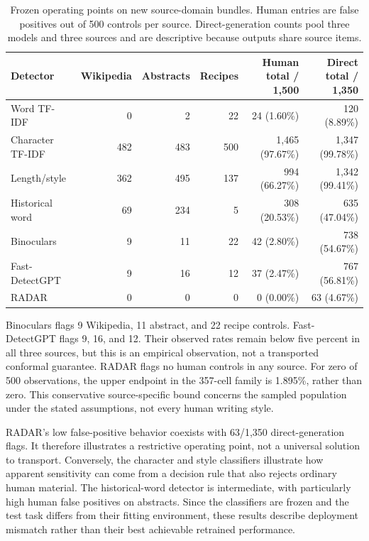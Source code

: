 \begin{table}[t]
\centering
\caption{Frozen operating points on new source-domain bundles. Human entries are false positives out of 500 controls per source. Direct-generation counts pool three models and three sources and are descriptive because outputs share source items.}
\label{tab:detectors}
\begin{tabular}{lrrrrr}
\toprule
Detector & Wikipedia & Abstracts & Recipes & Human total / 1,500 & Direct total / 1,350\\
\midrule
Word TF-IDF & 0 & 2 & 22 & 24 (1.60\%) & 120 (8.89\%)\\
Character TF-IDF & 482 & 483 & 500 & 1,465 (97.67\%) & 1,347 (99.78\%)\\
Length/style & 362 & 495 & 137 & 994 (66.27\%) & 1,342 (99.41\%)\\
Historical word & 69 & 234 & 5 & 308 (20.53\%) & 635 (47.04\%)\\
Binoculars & 9 & 11 & 22 & 42 (2.80\%) & 738 (54.67\%)\\
Fast-DetectGPT & 9 & 16 & 12 & 37 (2.47\%) & 767 (56.81\%)\\
RADAR & 0 & 0 & 0 & 0 (0.00\%) & 63 (4.67\%)\\
\bottomrule
\end{tabular}
\end{table}

Binoculars flags 9 Wikipedia, 11 abstract, and 22 recipe controls. Fast-DetectGPT flags 9, 16, and 12. Their observed rates remain below five percent in all three sources, but this is an empirical observation, not a transported conformal guarantee. RADAR flags no human controls in any source. For zero of 500 observations, the upper endpoint in the 357-cell family is 1.895\%, rather than zero. This conservative source-specific bound concerns the sampled population under the stated assumptions, not every human writing style.

RADAR's low false-positive behavior coexists with 63/1,350 direct-generation flags. It therefore illustrates a restrictive operating point, not a universal solution to transport. Conversely, the character and style classifiers illustrate how apparent sensitivity can come from a decision rule that also rejects ordinary human material. The historical-word detector is intermediate, with particularly high human false positives on abstracts. Since the classifiers are frozen and the test task differs from their fitting environment, these results describe deployment mismatch rather than their best achievable retrained performance.

